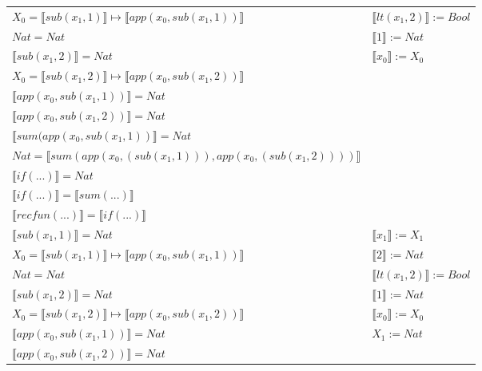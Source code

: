 \begin{exercise}
\begin{description}
\begin{center}
\begin{longtable}[!h]{ | l | l | }
                        $X_0 =  \llbracket sub(x_1,1) \rrbracket \mapsto  \llbracket app(x_0, sub(x_1,1)) \rrbracket$ &  $ \llbracket lt(x_1 , 2) \rrbracket := Bool$ \\
                        $Nat = Nat$ & $ \llbracket 1 \rrbracket := Nat$ \\
                        $ \llbracket sub(x_1,2) \rrbracket = Nat$ & $ \llbracket x_0 \rrbracket := X_0$ \\
                        $X_0 =  \llbracket sub(x_1,2) \rrbracket \mapsto  \llbracket app(x_0, sub(x_1,2)) \rrbracket$ &  \\
                        $ \llbracket app(x_0, sub(x_1,1)) \rrbracket = Nat$ & \\
                        $ \llbracket app(x_0, sub(x_1,2)) \rrbracket = Nat$ & \\
                        $ \llbracket sum(app(x_0, sub(x_1,1)) \rrbracket = Nat$ & \\
                        $Nat =  \llbracket sum(app(x_0, (sub(x_1,1))), app(x_0, (sub(x_1,2)))) \rrbracket$ & \\
                        $ \llbracket if(...) \rrbracket = Nat$ & \\
                        $ \llbracket if(...) \rrbracket =  \llbracket sum(...) \rrbracket$ & \\
                        $ \llbracket recfun(...) \rrbracket =   \llbracket if(...) \rrbracket$ & \\
                    \hline 
                        $ \llbracket sub(x_1,1) \rrbracket = Nat$ &  $ \llbracket x_1 \rrbracket := X_1$ \\
                        $X_0 =  \llbracket sub(x_1,1) \rrbracket \mapsto  \llbracket app(x_0, sub(x_1,1)) \rrbracket$ & $ \llbracket 2 \rrbracket := Nat$ \\
                        $Nat = Nat$ & $ \llbracket lt(x_1 , 2) \rrbracket := Bool$ \\
                        $ \llbracket sub(x_1,2) \rrbracket = Nat$ & $ \llbracket 1 \rrbracket := Nat$ \\
                        $X_0 =  \llbracket sub(x_1,2) \rrbracket \mapsto  \llbracket app(x_0, sub(x_1,2)) \rrbracket$ & $ \llbracket x_0 \rrbracket := X_0$  \\
                        $ \llbracket app(x_0, sub(x_1,1)) \rrbracket = Nat$ & $X_1 := Nat$\\
                        $ \llbracket app(x_0, sub(x_1,2)) \rrbracket = Nat$ & \\

\end{longtable}
\end{center}
\end{description}
\end{exercise}
